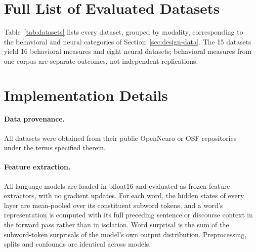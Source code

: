 

\section{Full List of Evaluated Datasets}
\label{app:datasets}

Table~\ref{tab:datasets} lists every dataset, grouped by modality, corresponding to the behavioral and neural categories of Section~\ref{sec:design-data}. The 15 datasets yield 16 behavioral measures and eight neural datasets; behavioral measures from one corpus are separate outcomes, not independent replications.



\section{Implementation Details}
\label{app:implementation}

\paragraph{Data provenance.} All datasets were obtained from their public OpenNeuro or OSF repositories under the terms specified therein.

\paragraph{Feature extraction.} All language models are loaded in bfloat16 and evaluated as frozen feature extractors, with no gradient updates. For each word, the hidden states of every layer are mean-pooled over its constituent subword tokens, and a word's representation is computed with its full preceding sentence or discourse context in the forward pass rather than in isolation. Word surprisal is the sum of the subword-token surprisals of the model's own output distribution. Preprocessing, splits and confounds are identical across models.

